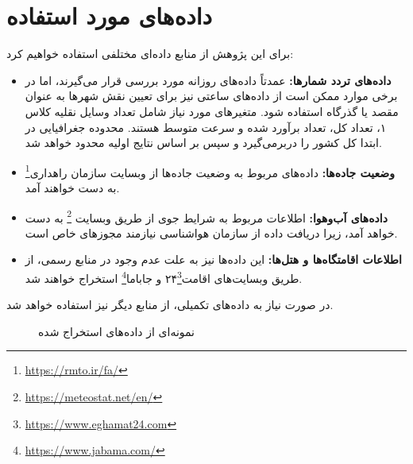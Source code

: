 \documentclass[a4paper, 12pt]{article}
\begin{document}
\section{داده‌های مورد استفاده}
برای این پژوهش از منابع داده‌ای مختلفی استفاده خواهیم کرد:
\begin{itemize}
    \item \textbf{داده‌های تردد شمارها:} عمدتاً داده‌های روزانه مورد بررسی قرار می‌گیرند، اما در برخی موارد ممکن است از داده‌های ساعتی نیز برای تعیین نقش شهرها به عنوان مقصد یا گذرگاه استفاده شود. متغیرهای مورد نیاز شامل تعداد وسایل نقلیه کلاس ۱، تعداد کل، تعداد برآورد شده و سرعت متوسط هستند. محدوده جغرافیایی در ابتدا کل کشور را دربرمی‌گیرد و سپس بر اساس نتایج اولیه محدود خواهد شد.
    \item \textbf{وضعیت جاده‌ها:} داده‌های مربوط به وضعیت جاده‌ها از وبسایت سازمان راهداری\footnote{\url{https://rmto.ir/fa/}} به دست خواهند آمد.
    \item \textbf{داده‌های آب‌وهوا:} اطلاعات مربوط به شرایط جوی از طریق وبسایت \footnote{\url{https://meteostat.net/en/}} به دست خواهد آمد، زیرا دریافت داده از سازمان هواشناسی نیازمند مجوزهای خاص است.
    \item \textbf{اطلاعات اقامتگاه‌ها و هتل‌ها:} این داده‌ها نیز به علت عدم وجود در منابع رسمی، از طریق وبسایت‌های اقامت۲۴\footnote{\url{https://www.eghamat24.com}} و جاباما\footnote{\url{https://www.jabama.com/}} استخراج خواهند شد.
\end{itemize}

در صورت نیاز به داده‌های تکمیلی، از منابع دیگر نیز استفاده خواهد شد.

\begin{figure}[htbp]
    \centering
    \caption{نمونه‌ای از داده‌های استخراج شده}
\end{figure}
\end{document}
